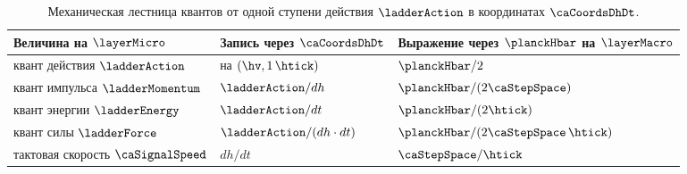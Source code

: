 \begin{table}[ht]
\centering
\caption{Механическая лестница квантов от одной ступени действия $\ladderAction$ в координатах $\caCoordsDhDt$.}
\label{tab:dh-dt-bridge}
\begin{tabular}{@{}lll@{}}
\toprule
Величина на $\layerMicro$ & Запись через $\caCoordsDhDt$ & Выражение через $\planckHbar$ на $\layerMacro$ \\
\midrule
квант действия $\ladderAction$ & на $(\hv,1\,\htick)$ & $\planckHbar/2$ \\
квант импульса $\ladderMomentum$ & $\ladderAction/dh$ & $\planckHbar/(2\caStepSpace)$ \\
квант энергии $\ladderEnergy$ & $\ladderAction/dt$ & $\planckHbar/(2\htick)$ \\
квант силы $\ladderForce$ & $\ladderAction/(dh\cdot dt)$ & $\planckHbar/(2\caStepSpace\,\htick)$ \\
тактовая скорость $\caSignalSpeed$ & $dh/dt$ & $\caStepSpace/\htick$ \\
\bottomrule
\end{tabular}
\end{table}
